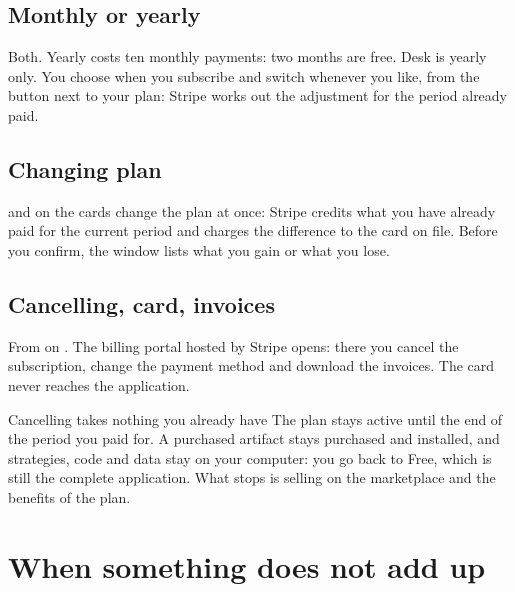 \subsection{Monthly or yearly}

Both. Yearly costs ten monthly payments: two months are free. Desk is yearly
only. You choose when you subscribe and switch whenever you like, from the
button next to your plan: Stripe works out the adjustment for the period
already paid.

\subsection{Changing plan}

 and  on the cards change the plan
at once: Stripe credits what you have already paid for the current period and
charges the difference to the card on file. Before you confirm, the window
lists what you gain or what you lose.

\subsection{Cancelling, card, invoices}

From  on . The billing
portal hosted by Stripe opens: there you cancel the subscription, change the
payment method and download the invoices. The card never reaches the
application.

\begin{nota}{Cancelling takes nothing you already have}
The plan stays active until the end of the period you paid for. A purchased
artifact stays purchased and installed, and strategies, code and data stay on
your computer: you go back to Free, which is still the complete application.
What stops is selling on the marketplace and the benefits of the plan.
\end{nota}

\section{When something does not add up}\label{sez:account-problems}

